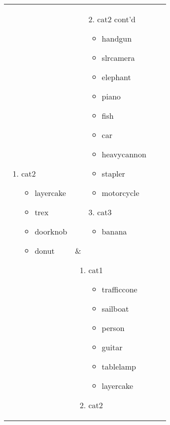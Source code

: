 \begin{figure}
\begin{tabular}{llll}
{\begin{enumerate}
\begin{itemize}[leftmargin=*]
	\item sailboat
	\item person
	\item guitar
	\item tablelamp
	\item chair
	\end{itemize}
	\item cat2
	\begin{itemize}[leftmargin=*]
	\item layercake
	\item trex
	\item doorknob
	\item donut
	\end{itemize}
	\end{enumerate}
	} & 
	 \parbox[t]{1.4in}{\raggedright 	{} \small
	\begin{enumerate}
	\item[2.] cat2 cont'd
	\begin{itemize}[leftmargin=*]
	\item handgun
	\item slrcamera
	\item elephant
	\item piano
	\item fish
	\item car
	\item heavycannon
	\item stapler
	\item motorcycle
	\end{itemize}
	\item[3.] cat3
	\begin{itemize}[leftmargin=*]
	\item banana
	\end{itemize}
	\end{enumerate}
	} & 
	 \parbox[t]{1.4in}{\raggedright  	{} \small
	\begin{enumerate}
	\item cat1
	\begin{itemize}[leftmargin=*]
	\item trafficcone
	\item sailboat
	\item person
	\item guitar
	\item tablelamp
	\item layercake
	\end{itemize}
	\item cat2
	\begin{itemize}[leftmargin=*]

\end{itemize}
\end{enumerate}}
\end{tabular}
\end{figure}
